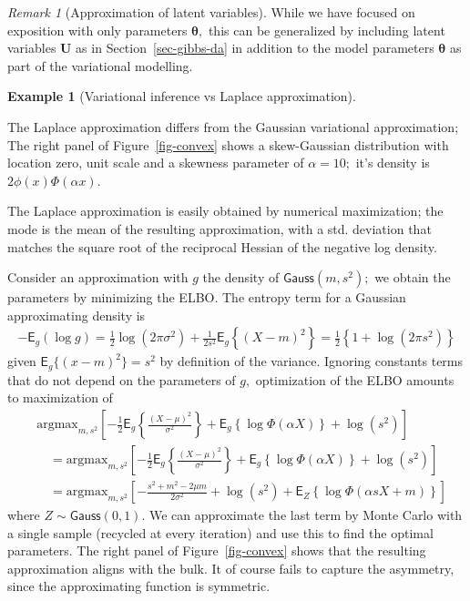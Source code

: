 \documentclass[
  11pt,
  letterpaper,
]{scrbook}
\theoremstyle{plain}
\theoremstyle{definition}
\theoremstyle{definition}
\newtheorem{example}{Example}[chapter]
\theoremstyle{plain}
\theoremstyle{plain}
\theoremstyle{definition}
\theoremstyle{remark}
\newtheorem{refremark}{Remark}[chapter]
\begin{document}
\begin{refremark}[Approximation of latent variables]
While we have focused on exposition with only parameters
\(\boldsymbol{\theta},\) this can be generalized by including latent
variables \(\boldsymbol{U}\) as in Section~\ref{sec-gibbs-da} in
addition to the model parameters \(\boldsymbol{\theta}\) as part of the
variational modelling.

\label{rem-approximation-latent}

\end{refremark}

\begin{example}[Variational inference vs Laplace
approximation]\protect\hypertarget{exm-varional-vs-laplace}{}\label{exm-varional-vs-laplace}

The Laplace approximation differs from the Gaussian variational
approximation; The right panel of Figure~\ref{fig-convex} shows a
skew-Gaussian distribution with location zero, unit scale and a skewness
parameter of \(\alpha=10;\) it's density is \(2\phi(x)\Phi(\alpha x).\)

The Laplace approximation is easily obtained by numerical maximization;
the mode is the mean of the resulting approximation, with a std.
deviation that matches the square root of the reciprocal Hessian of the
negative log density.

Consider an approximation with \(g\) the density of
\(\mathsf{Gauss}(m, s^2);\) we obtain the parameters by minimizing the
ELBO. The entropy term for a Gaussian approximating density is
\begin{align*}
-\mathsf{E}_g(\log g) = \frac{1}{2}\log(2\pi \sigma^2) + \frac{1}{2s^2}\mathsf{E}_g\left\{(X-m)^2 \right\} = \frac{1}{2} \left\{1+\log(2\pi s^2)\right\}
\end{align*} given \(\mathsf{E}_g\{(x-m)^2\}=s^2\) by definition of the
variance. Ignoring constants terms that do not depend on the parameters
of \(g,\) optimization of the ELBO amounts to maximization of
\begin{align*}
&\mathrm{argmax}_{m, s^2} \left[-\frac{1}{2} \mathsf{E}_g \left\{ \frac{(X-\mu)^2}{\sigma^2}\right\} + \mathsf{E}_g\left\{\log \Phi(\alpha X)\right\} + \log(s^2) \right] \\
&\quad =\mathrm{argmax}_{m, s^2} \left[ -\frac{1}{2} \mathsf{E}_g \left\{ \frac{(X-\mu)^2}{\sigma^2}\right\} + \mathsf{E}_g\left\{\log \Phi(\alpha X)\right\} + \log(s^2) \right]
\\&\quad =\mathrm{argmax}_{m, s^2} \left[ -\frac{s^2 + m^2 -2\mu m}{2\sigma^2} + \log(s^2) + \mathsf{E}_{Z}\left\{\log \Phi(\alpha sX+m)\right\} \right]
\end{align*} where \(Z \sim \mathsf{Gauss}(0,1).\) We can approximate
the last term by Monte Carlo with a single sample (recycled at every
iteration) and use this to find the optimal parameters. The right panel
of Figure~\ref{fig-convex} shows that the resulting approximation aligns
with the bulk. It of course fails to capture the asymmetry, since the
approximating function is symmetric.

\end{example}
\end{document}
